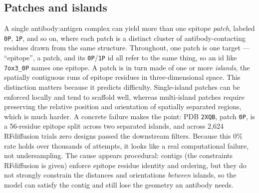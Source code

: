 \subsection{Patches and islands}
A single antibody:antigen complex can yield more than one epitope \emph{patch}, labeled
\texttt{0P}, \texttt{1P}, and so on, where each patch is a distinct cluster of
antibody-contacting residues drawn from the same structure. Throughout, one patch is one target ---
``epitope'', a patch, and its \texttt{0P}/\texttt{1P} id all refer to the same thing, so an id like
\texttt{7ox3\_0P} names one epitope. A patch is in turn made of one
or more \emph{islands}, the spatially contiguous runs of epitope residues in
three-dimensional space. This distinction matters because it predicts difficulty.
Single-island patches can be enforced locally and tend to scaffold well, whereas
multi-island patches require preserving the relative position and orientation of spatially
separated regions, which is much harder. A concrete failure makes the point: PDB
\texttt{2XQB}, patch \texttt{0P}, is a 56-residue epitope split across two separated
islands, and across 2{,}624 RFdiffusion trials zero designs passed the downstream filters.
Because this $0\%$ rate holds over thousands of attempts, it looks like a real
computational failure, not undersampling. The cause appears procedural: contigs (the
constraints RFdiffusion is given) enforce epitope residue identity and ordering, but they
do not strongly constrain the distances and orientations \emph{between} islands, so the
model can satisfy the contig and still lose the geometry an antibody needs.

